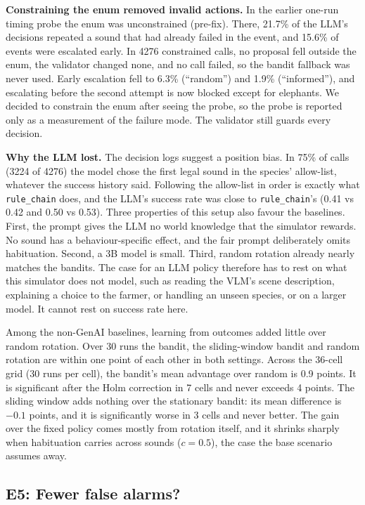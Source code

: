 \documentclass[conference]{IEEEtran}
\newcommand{\todo}[1]{\textcolor{red}{[TODO: #1]}}
\begin{document}
\textbf{Constraining the enum removed invalid actions.} In the earlier one-run timing probe the enum was
unconstrained (pre-fix). There, 21.7\% of the LLM's decisions repeated a sound that had already failed in
the event, and 15.6\% of events were escalated early. In 4276 constrained calls, no proposal fell outside
the enum, the validator changed none, and no call failed, so the bandit fallback was never used. Early
escalation fell to 6.3\% (``random'') and 1.9\% (``informed''), and escalating before the second attempt is
now blocked except for elephants. We decided to constrain the enum after seeing the probe, so the probe is
reported only as a measurement of the failure mode. The validator still guards every decision.

\textbf{Why the LLM lost.} The decision logs suggest a position bias. In 75\% of calls (3224 of 4276) the
model chose the first legal sound in the species' allow-list, whatever the success history said. Following
the allow-list in order is exactly what \texttt{rule\_chain} does, and the LLM's success rate was close to
\texttt{rule\_chain}'s (0.41 vs 0.42 and 0.50 vs 0.53). Three properties of this setup also favour the
baselines. First, the prompt gives the LLM no world knowledge that the simulator rewards. No sound has a
behaviour-specific effect, and the fair prompt deliberately omits habituation. Second, a 3B model is small.
Third, random rotation already nearly matches the bandits. The case for an LLM policy therefore has to rest
on what this simulator does not model, such as reading the VLM's scene description, explaining a choice to
the farmer, or handling an unseen species, or on a larger model. It cannot rest on success rate here.

Among the non-GenAI baselines, learning from outcomes added little over random rotation. Over 30 runs the
bandit, the sliding-window bandit and random rotation are within one point of each other in both settings.
Across the 36-cell grid (30 runs per cell), the bandit's mean advantage over random is 0.9 points. It is
significant after the Holm correction in 7 cells and never exceeds 4 points. The sliding window adds
nothing over the stationary bandit: its mean difference is $-0.1$ points, and it is significantly worse in
3 cells and never better. The gain over the fixed policy comes mostly from rotation itself, and it shrinks
sharply when habituation carries across sounds ($c=0.5$), the case the base scenario assumes away.

\subsection{E5: Fewer false alarms?}
\IfFileExists{tables/e5_ollama-qwen2.5vl-7b.tex}{}{\todo{E5 table: needs clips, intervals and a VLM}}
\end{document}
